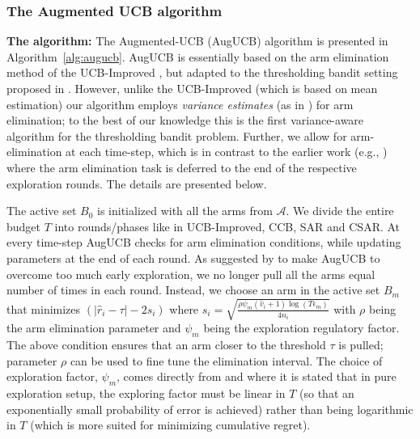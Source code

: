 \documentclass[MS,synopsis]{iitmdiss}
\begin{document}
\subsubsection{The Augmented UCB algorithm}

\textbf{The algorithm:} The Augmented-UCB (AugUCB) algorithm is presented in Algorithm~\ref{alg:augucb}.
AugUCB is essentially based on the arm elimination method of the UCB-Improved \citep{auer2010ucb}, but adapted to the thresholding bandit setting proposed in \cite{locatelli2016optimal}. However, unlike the UCB-Improved (which is based on mean estimation) our algorithm employs \emph{variance estimates} (as in \cite{audibert2009exploration}) for arm elimination; to the best of our knowledge this is the first variance-aware  algorithm for the thresholding bandit problem. Further, we allow for arm-elimination at each time-step, which is in contrast to the earlier work (e.g., \cite{auer2010ucb,chen2014combinatorial}) where the arm elimination task is deferred to the end of the respective exploration rounds. The details are presented below.

The active set $B_{0}$ is initialized with all the arms from $\mathcal{A}$. We divide the entire budget $T$ into rounds/phases like in UCB-Improved, CCB, SAR and CSAR. At every time-step AugUCB checks for arm elimination conditions, while updating parameters at the end of each round. As suggested by \cite{liu2016modification} to make AugUCB to overcome too much early exploration, we no longer pull all the arms equal number of times in each round. Instead, we choose an arm in the active set $B_m$ that minimizes $(|\hat{r}_{i} - \tau |-2s_i)$ where $s_i  = \sqrt{\frac{\rho\psi_m (\hat{v}_{i}+1) \log ( T \epsilon_{m})}{4 n_{i}}}$ with $\rho$ being the arm elimination parameter and $\psi_{m}$ being the exploration regulatory factor.
The above condition ensures that an arm closer to the threshold $\tau$ is pulled; 
parameter $\rho$ can be used to fine tune the elimination interval.
The choice of exploration factor, $\psi_m$, comes directly from \cite{audibert2010best} and \cite{bubeck2011pure} where it is  stated that in pure exploration setup, the exploring factor must be linear in $T$ (so that an exponentially small probability of error is achieved) rather than being logarithmic in $T$ (which is more suited for minimizing cumulative regret).
\end{document}
